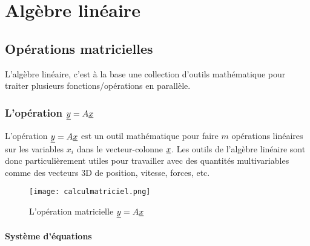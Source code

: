 \chapter{Algèbre linéaire}


\section{Opérations matricielles}
\label{sec:opmat}
L'algèbre linéaire, c'est à la base une collection d'outils mathématique pour traiter plusieurs fonctions/opérations en parallèle.

\subsection{L'opération $\underline{y} = A \underline{x}$}

 L'opération $\underline{y} = A \underline{x}$ est un outil mathématique pour faire $m$ opérations linéaires sur les variables $x_i$ dans le vecteur-colonne $\underline{x}$. Les outils de l'algèbre linéaire sont donc particulièrement utiles pour travailler avec des quantités multivariables comme des vecteurs 3D de position, vitesse, forces, etc.

\begin{figure}[htbp]
	\centering
		\texttt{[image: calculmatriciel.png]}
	\caption{L'opération matricielle $\underline{y} = A \underline{x}$}
	\label{fig:calculmatriciel}
\end{figure}

\subsubsection{Système d’équations}
\label{sec:syseq}

